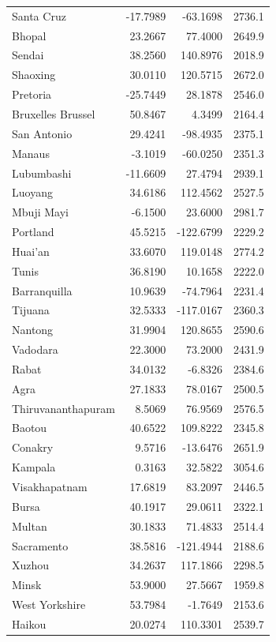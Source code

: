 \begin{longtable}{lrrc}
Santa Cruz & -17.7989 & -63.1698 & 2736.1 \\
Bhopal & 23.2667 & 77.4000 & 2649.9 \\
Sendai & 38.2560 & 140.8976 & 2018.9 \\
Shaoxing & 30.0110 & 120.5715 & 2672.0 \\
Pretoria & -25.7449 & 28.1878 & 2546.0 \\
Bruxelles Brussel & 50.8467 & 4.3499 & 2164.4 \\
San Antonio & 29.4241 & -98.4935 & 2375.1 \\
Manaus & -3.1019 & -60.0250 & 2351.3 \\
Lubumbashi & -11.6609 & 27.4794 & 2939.1 \\
Luoyang & 34.6186 & 112.4562 & 2527.5 \\
Mbuji Mayi & -6.1500 & 23.6000 & 2981.7 \\
Portland & 45.5215 & -122.6799 & 2229.2 \\
Huai'an & 33.6070 & 119.0148 & 2774.2 \\
Tunis & 36.8190 & 10.1658 & 2222.0 \\
Barranquilla & 10.9639 & -74.7964 & 2231.4 \\
Tijuana & 32.5333 & -117.0167 & 2360.3 \\
Nantong & 31.9904 & 120.8655 & 2590.6 \\
Vadodara & 22.3000 & 73.2000 & 2431.9 \\
Rabat & 34.0132 & -6.8326 & 2384.6 \\
Agra & 27.1833 & 78.0167 & 2500.5 \\
Thiruvananthapuram & 8.5069 & 76.9569 & 2576.5 \\
Baotou & 40.6522 & 109.8222 & 2345.8 \\
Conakry & 9.5716 & -13.6476 & 2651.9 \\
Kampala & 0.3163 & 32.5822 & 3054.6 \\
Visakhapatnam & 17.6819 & 83.2097 & 2446.5 \\
Bursa & 40.1917 & 29.0611 & 2322.1 \\
Multan & 30.1833 & 71.4833 & 2514.4 \\
Sacramento & 38.5816 & -121.4944 & 2188.6 \\
Xuzhou & 34.2637 & 117.1866 & 2298.5 \\
Minsk & 53.9000 & 27.5667 & 1959.8 \\
West Yorkshire & 53.7984 & -1.7649 & 2153.6 \\
Haikou & 20.0274 & 110.3301 & 2539.7 \\

\end{longtable}
